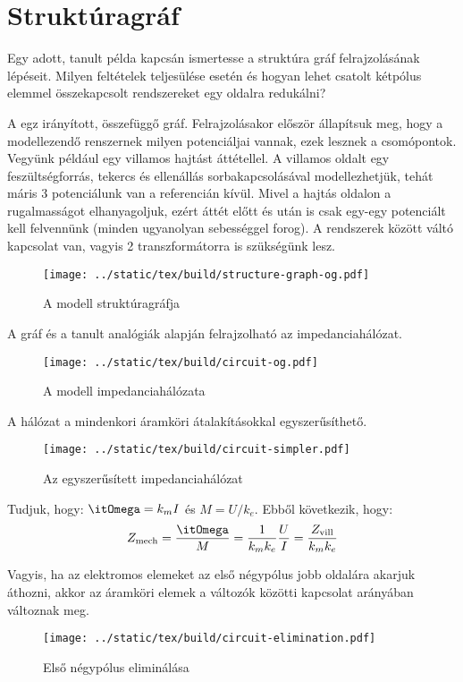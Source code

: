 \documentclass[../main.tex]{subfiles}
\begin{document}
\section{Struktúragráf}

\begin{fulltheorem}
  Egy adott, tanult példa kapcsán ismertesse a struktúra gráf felrajzolásának
  lépéseit. Milyen feltételek teljesülése esetén és hogyan lehet csatolt
  kétpólus elemmel összekapcsolt rendszereket egy oldalra redukálni?
\end{fulltheorem}

A  egz irányított, összefüggő gráf.
Felrajzolásakor először állapítsuk meg, hogy a modellezendő renszernek milyen
potenciáljai vannak, ezek lesznek a csomópontok. Vegyünk például egy villamos hajtást
áttétellel. A villamos oldalt egy feszültségforrás, tekercs és ellenállás
sorbakapcsolásával modellezhetjük, tehát máris 3 potenciálunk van a referencián
kívül. Mivel a hajtás oldalon a rugalmasságot elhanyagoljuk, ezért áttét előtt
és után is csak egy-egy potenciált kell felvennünk (minden ugyanolyan sebességgel
forog). A rendszerek között váltó kapcsolat van, vagyis 2 transzformátorra is
szükségünk lesz.
\begin{figure}[H]
  \centering
  \texttt{[image: ../static/tex/build/structure-graph-og.pdf]}
  \caption{A modell struktúragráfja}
  \label{fig:structure-graph-og}
\end{figure}

A gráf és a tanult analógiák alapján felrajzolható az impedanciahálózat.
\begin{figure}[H]
  \centering
  \texttt{[image: ../static/tex/build/circuit-og.pdf]}
  \caption{A modell impedanciahálózata}
  \label{fig:circuit-og}
\end{figure}

A hálózat a mindenkori áramköri átalakításokkal egyszerűsíthető.
\begin{figure}[H]
  \centering
  \texttt{[image: ../static/tex/build/circuit-simpler.pdf]}
  \caption{Az egyszerűsített impedanciahálózat}
  \label{fig:circuit-simpler}
\end{figure}

Tudjuk, hogy: $\itOmega = k_m I$ és $M = U / k_e$. Ebből következik, hogy:
\[
  Z_\text{mech}
  = \frac{\itOmega}{M}
  = \frac{1}{k_m k_e} \frac{U}{I}
  = \frac{Z_\text{vill}}{k_m k_e}
\]

Vagyis, ha az elektromos elemeket az első négypólus jobb oldalára akarjuk
áthozni, akkor az áramköri elemek a változók közötti kapcsolat arányában
változnak meg.
\begin{figure}[H]
  \centering
  \texttt{[image: ../static/tex/build/circuit-elimination.pdf]}
  \caption{Első négypólus eliminálása}
  \label{fig:circuit-elimination}
\end{figure}
\end{document}
